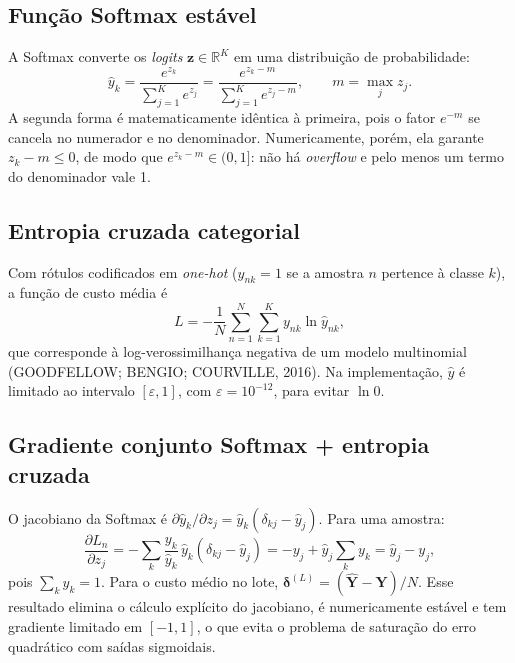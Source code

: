 \documentclass[12pt,a4paper]{article}
\begin{document}
\subsection{Função Softmax estável}

A Softmax converte os \textit{logits} $\mathbf{z}\in\mathbb{R}^{K}$ em uma distribuição de
probabilidade:
\begin{equation}
  \hat{y}_k=\frac{e^{z_k}}{\sum_{j=1}^{K} e^{z_j}}
  =\frac{e^{z_k-m}}{\sum_{j=1}^{K} e^{z_j-m}},\qquad m=\max_j z_j. \label{eq:softmax}
\end{equation}
A segunda forma é matematicamente idêntica à primeira, pois o fator $e^{-m}$ se cancela no numerador e
no denominador. Numericamente, porém, ela garante $z_k-m\le 0$, de modo que $e^{z_k-m}\in(0,1]$: não há
\textit{overflow} e pelo menos um termo do denominador vale 1.

\subsection{Entropia cruzada categorial}

Com rótulos codificados em \textit{one-hot} ($y_{nk}=1$ se a amostra $n$ pertence à classe $k$), a
função de custo média é
\begin{equation}
  L=-\frac{1}{N}\sum_{n=1}^{N}\sum_{k=1}^{K} y_{nk}\ln \hat{y}_{nk}, \label{eq:ce}
\end{equation}
que corresponde à log-verossimilhança negativa de um modelo multinomial (GOODFELLOW; BENGIO; COURVILLE, 2016). Na
implementação, $\hat{y}$ é limitado ao intervalo $[\varepsilon,1]$, com $\varepsilon=10^{-12}$, para
evitar $\ln 0$.

\subsection{Gradiente conjunto Softmax + entropia cruzada}

O jacobiano da Softmax é $\partial\hat{y}_k/\partial z_j=\hat{y}_k(\delta_{kj}-\hat{y}_j)$. Para uma
amostra:
\begin{equation}
  \frac{\partial L_n}{\partial z_j}
  =-\sum_{k}\frac{y_k}{\hat{y}_k}\,\hat{y}_k(\delta_{kj}-\hat{y}_j)
  =-y_j+\hat{y}_j\sum_{k}y_k
  =\hat{y}_j-y_j, \label{eq:grad_saida}
\end{equation}
pois $\sum_k y_k=1$. Para o custo médio no lote, $\boldsymbol{\delta}^{(L)}=(\hat{\mathbf{Y}}-\mathbf{Y})/N$.
Esse resultado elimina o cálculo explícito do jacobiano, é numericamente estável e tem gradiente
limitado em $[-1,1]$, o que evita o problema de saturação do erro quadrático com saídas sigmoidais.
\end{document}
